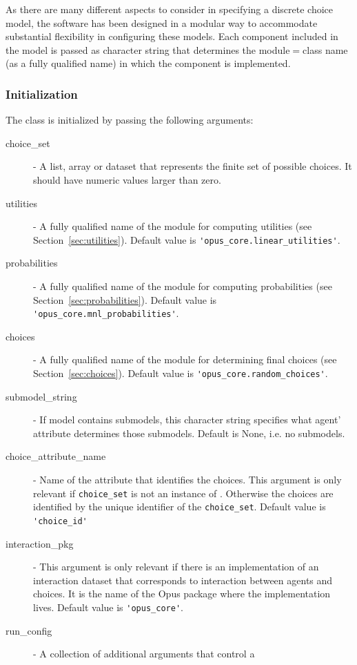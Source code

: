 {As there are many different aspects to consider in specifying a discrete
choice model, the software has been designed in a modular way to accommodate
substantial flexibility in configuring these models. Each component included
in the model is passed as character string that determines the module$=$class
name (as a fully qualified name) in which the component is implemented.

\subsubsection{Initialization}
%
The class is initialized by passing the following arguments:
\begin{description}
\item[choice_set] - A list, array or dataset \datasetindex that represents the finite set of
  possible choices. It should have numeric values larger than zero.
\item[utilities] - A fully qualified name of the module for computing utilities
  (see Section~\ref{sec:utilities}). Default value is
  \verb|'opus_core.linear_utilities'|.
\item[probabilities] - A fully qualified name of the module for computing
  probabilities (see Section~\ref{sec:probabilities}). Default value is
  \verb|'opus_core.mnl_probabilities'|.
\item[choices] - A fully qualified name of the module for determining
  final choices (see Section~\ref{sec:choices}). Default value is
  \verb|'opus_core.random_choices'|.
\item[submodel_string] - If model contains submodels, this character string
  specifies what agent' attribute \attributesindex determines those submodels. Default is None, i.e. no submodels.
\item[choice_attribute_name] - Name of the attribute \attributesindex that identifies the
  choices. This argument is only relevant if \verb|choice_set| is not an
  instance of . \datasetindex Otherwise the choices are identified by the
  unique identifier of the \verb|choice_set|. Default value is
  \verb|'choice_id'|
\item[interaction_pkg] - This argument is only relevant if there is an
  implementation of an interaction dataset that corresponds to interaction
  between agents and choices. It is the name of the Opus package where the implementation lives.
  Default value is \verb|'opus_core'|.
\item[run_config] - A collection of additional arguments that control a

\end{description}}
